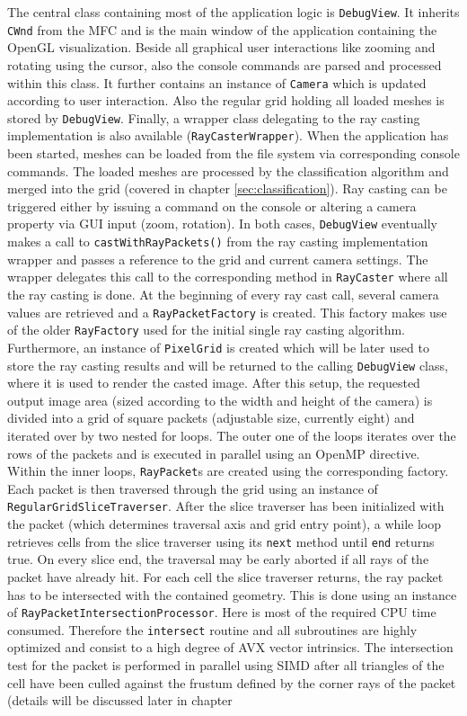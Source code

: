 The central class containing most of the application logic is \lstinline!DebugView!. It inherits \lstinline!CWnd! from the MFC and is the main window of the application containing the OpenGL visualization. Beside all graphical user interactions like zooming and rotating using the cursor, also the console commands are parsed and processed within this class. It further contains an instance of \lstinline!Camera! which is updated according to user interaction. Also the regular grid holding all loaded meshes is stored by \lstinline!DebugView!. Finally, a wrapper class delegating to the ray casting implementation is also available (\lstinline!RayCasterWrapper!). When the application has been started, meshes can be loaded from the file system via corresponding console commands. The loaded meshes are processed by the classification algorithm and merged into the grid (covered in chapter \ref{sec:classification}). Ray casting can be triggered either by issuing a command on the console or altering a camera property via GUI input (zoom, rotation). In both cases, \lstinline!DebugView! eventually makes a call to \lstinline!castWithRayPackets()! from the ray casting implementation wrapper and passes a reference to the grid and current camera settings. The wrapper delegates this call to the corresponding method in \lstinline!RayCaster! where all the ray casting is done. At the beginning of every ray cast call, several camera values are retrieved and a \lstinline!RayPacketFactory! is created. This factory makes use of the older \lstinline!RayFactory! used for the initial single ray casting algorithm. Furthermore, an instance of \lstinline!PixelGrid! is created which will be later used to store the ray casting results and will be returned to the calling \lstinline!DebugView! class, where it is used to render the casted image. After this setup, the requested output image area (sized according to the width and height of the camera) is divided into a grid of square packets (adjustable size, currently eight) and iterated over by two nested for loops. The outer one of the loops iterates over the rows of the packets and is executed in parallel using an OpenMP directive. Within the inner loops, \lstinline!RayPacket!s are created using the corresponding factory. Each packet is then traversed through the grid using an instance of \lstinline!RegularGridSliceTraverser!. After the slice traverser has been initialized with the packet (which determines traversal axis and grid entry point), a while loop retrieves cells from the slice traverser using its \lstinline!next! method until \lstinline!end! returns true. On every slice end, the traversal may be early aborted if all rays of the packet have already hit. For each cell the slice traverser returns, the ray packet has to be intersected with the contained geometry. This is done using an instance of \lstinline!RayPacketIntersectionProcessor!. Here is most of the required CPU time consumed. Therefore the \lstinline!intersect! routine and all subroutines are highly optimized and consist to a high degree of AVX vector intrinsics. The intersection test for the packet is performed in parallel using SIMD after all triangles of the cell have been culled against the frustum defined by the corner rays of the packet (details will be discussed later in chapter 